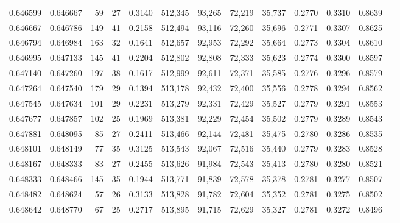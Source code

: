 \begin{tabular}{rrrrrrrrrrrrr}
0.646599 & 0.646667 &     59 &    27 &                                     0.3140 & 512,345 &  93,265 &  72,219 &  35,737 & 0.2770 & 0.3310 & 0.8639 \\
0.646667 & 0.646786 &    149 &    41 &                                     0.2158 & 512,494 &  93,116 &  72,260 &  35,696 & 0.2771 & 0.3307 & 0.8625 \\
0.646794 & 0.646984 &    163 &    32 &                                     0.1641 & 512,657 &  92,953 &  72,292 &  35,664 & 0.2773 & 0.3304 & 0.8610 \\
0.646995 & 0.647133 &    145 &    41 &                                     0.2204 & 512,802 &  92,808 &  72,333 &  35,623 & 0.2774 & 0.3300 & 0.8597 \\
0.647140 & 0.647260 &    197 &    38 &                                     0.1617 & 512,999 &  92,611 &  72,371 &  35,585 & 0.2776 & 0.3296 & 0.8579 \\
0.647264 & 0.647540 &    179 &    29 &                                     0.1394 & 513,178 &  92,432 &  72,400 &  35,556 & 0.2778 & 0.3294 & 0.8562 \\
0.647545 & 0.647634 &    101 &    29 &                                     0.2231 & 513,279 &  92,331 &  72,429 &  35,527 & 0.2779 & 0.3291 & 0.8553 \\
0.647677 & 0.647857 &    102 &    25 &                                     0.1969 & 513,381 &  92,229 &  72,454 &  35,502 & 0.2779 & 0.3289 & 0.8543 \\
0.647881 & 0.648095 &     85 &    27 &                                     0.2411 & 513,466 &  92,144 &  72,481 &  35,475 & 0.2780 & 0.3286 & 0.8535 \\
0.648101 & 0.648149 &     77 &    35 &                                     0.3125 & 513,543 &  92,067 &  72,516 &  35,440 & 0.2779 & 0.3283 & 0.8528 \\
0.648167 & 0.648333 &     83 &    27 &                                     0.2455 & 513,626 &  91,984 &  72,543 &  35,413 & 0.2780 & 0.3280 & 0.8521 \\
0.648333 & 0.648466 &    145 &    35 &                                     0.1944 & 513,771 &  91,839 &  72,578 &  35,378 & 0.2781 & 0.3277 & 0.8507 \\
0.648482 & 0.648624 &     57 &    26 &                                     0.3133 & 513,828 &  91,782 &  72,604 &  35,352 & 0.2781 & 0.3275 & 0.8502 \\
0.648642 & 0.648770 &     67 &    25 &                                     0.2717 & 513,895 &  91,715 &  72,629 &  35,327 & 0.2781 & 0.3272 & 0.8496 \\

\end{tabular}
